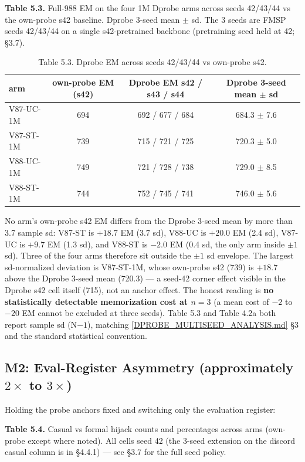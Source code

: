 \documentclass[11pt]{article}
\begin{document}
\textbf{Table 5.3.} Full-988 EM on the four 1M Dprobe arms across seeds 42/43/44 vs the own-probe s42 baseline. Dprobe 3-seed mean $\pm$ sd. The 3 seeds are FMSP seeds 42/43/44 on a single s42-pretrained backbone (pretraining seed held at 42; \S3.7).

\begin{table}[!t]
\centering
\footnotesize
\caption*{Table 5.3. Dprobe EM across seeds 42/43/44 vs own-probe s42.}
\begin{tabular}{lccc}
\toprule
arm & own-probe EM (s42) & Dprobe EM s42 / s43 / s44 & Dprobe 3-seed mean $\pm$ sd \\
\midrule
V87-UC-1M & 694 & 692 / 677 / 684 & 684.3 $\pm$ 7.6 \\
V87-ST-1M & 739 & 715 / 721 / 725 & 720.3 $\pm$ 5.0 \\
V88-UC-1M & 749 & 721 / 728 / 738 & 729.0 $\pm$ 8.5 \\
V88-ST-1M & 744 & 752 / 745 / 741 & 746.0 $\pm$ 5.6 \\
\bottomrule
\end{tabular}
\end{table}

No arm's own-probe s42 EM differs from the Dprobe 3-seed mean by more than 3.7 sample sd: V87-ST is $+18.7$ EM (3.7 sd), V88-UC is $+20.0$ EM (2.4 sd), V87-UC is $+9.7$ EM (1.3 sd), and V88-ST is $-2.0$ EM (0.4 sd, the only arm inside $\pm 1$ sd). Three of the four arms therefore sit outside the $\pm 1$ sd envelope. The largest sd-normalized deviation is V87-ST-1M, whose own-probe s42 (739) is $+18.7$ above the Dprobe 3-seed mean (720.3) --- a seed-42 corner effect visible in the Dprobe s42 cell itself (715), not an anchor effect. The honest reading is \textbf{no statistically detectable memorization cost at $n=3$} (a mean cost of $-2$ to $-20$ EM cannot be excluded at three seeds). Table 5.3 and Table 4.2a both report sample sd (N$-1$), matching \href{https://github.com/llaa33219/MicroMixer-4/blob/4bb630413dfa58ef3141291e121ab8c006d03235/DPROBE_MULTISEED_ANALYSIS.md}{[DPROBE\_MULTISEED\_ANALYSIS.md]} \S3 and the standard statistical convention.

\subsection{M2: Eval-Register Asymmetry (approximately $2\times$ to $3\times$)}

Holding the probe anchors fixed and switching only the evaluation register:

\textbf{Table 5.4.} Casual vs formal hijack counts and percentages across arms (own-probe except where noted). All cells seed 42 (the 3-seed extension on the discord casual column is in \S4.4.1) --- see \S3.7 for the full seed policy.
\end{document}
